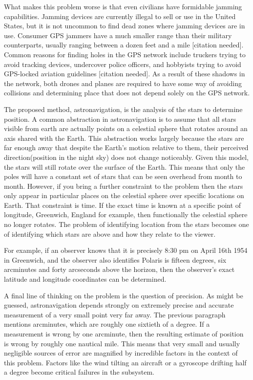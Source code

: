 \documentclass[]{article}
\begin{document}
    What makes this problem worse is that even civilians have formidable jamming capabilities. Jamming devices are currently illegal to sell or use in the United States, but it is not uncommon to find dead zones where jamming devices are in use. Consumer GPS jammers have a much smaller range than their military counterparts, usually ranging between a dozen feet and a mile [citation needed]. Common reasons for finding holes in the GPS network include truckers trying to avoid tracking devices, undercover police officers, and hobbyists trying to avoid GPS-locked aviation guidelines [citation needed]. As a result of these shadows in the network, both drones and planes are required to have some way of avoiding collisions and determining place that does not depend solely on the GPS network.\newline
    
    The proposed method, astronavigation, is the analysis of the stars to determine position. A common abstraction in astronavigation is to assume that all stars visible from earth are actually points on a celestial sphere that rotates around an axis shared with the Earth. This abstraction works largely because the stars are far enough away that despite the Earth's motion relative to them, their perceived direction(position in the night sky) does not change noticeably. Given this model, the stars will still rotate over the surface of the Earth. This means that only the poles will have a constant set of stars that can be seen overhead from month to month. However, if you bring a further constraint to the problem then the stars only appear in particular places on the celestial sphere over specific locations on Earth. That constraint is time. If the exact time is known at a specific point of longitude, Greenwich, England for example, then functionally the celestial sphere no longer rotates. The problem of identifying location from the stars becomes one of identifying which stars are above and how they relate to the viewer. \newline
    
    For example, if an observer knows that it is precisely 8:30 pm on April 16th 1954 in Greenwich, and the observer also identifies Polaris is fifteen degrees, six arcminutes and forty arcseconds above the horizon, then the observer's exact latitude and longitude coordinates can be determined.\newline
    
    A final line of thinking on the problem is the question of precision. As might be guessed, astronavigation depends strongly on extremely precise and accurate measurement of a very small point very far away. The previous paragraph mentions arcminutes, which are roughly one sixtieth of a degree. If a measurement is wrong by one arcminute, then the resulting estimate of position is wrong by roughly one nautical mile. This means that very small and usually negligible sources of error are magnified by incredible factors in the context of this problem. Factors like the wind tilting an aircraft or a gyroscope drifting half a degree become critical failures in the subsystem.\newline
\end{document}
